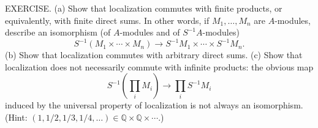 EXERCISE. (a) Show that localization commutes with finite products, or equivalently, with finite direct sums. In other words, if $M_1,\ldots,M_n$ are $A$-modules, describe an isomorphism (of $A$-modules and of $S^{-1}A$-modules)
$$
S^{-1}(M_1\times\cdots\times M_n)\longrightarrow S^{-1}M_1\times\cdots\times S^{-1}M_n.
$$
(b) Show that localization commutes with arbitrary direct sums. (c) Show that localization does not necessarily commute with infinite products: the obvious map
$$
S^{-1}\left(\prod_i M_i\right)\longrightarrow\prod_i S^{-1}M_i
$$
induced by the universal property of localization is not always an isomorphism. (Hint: $(1,1/2,1/3,1/4,\ldots)\in\mathbb{Q}\times\mathbb{Q}\times\cdots$.)
